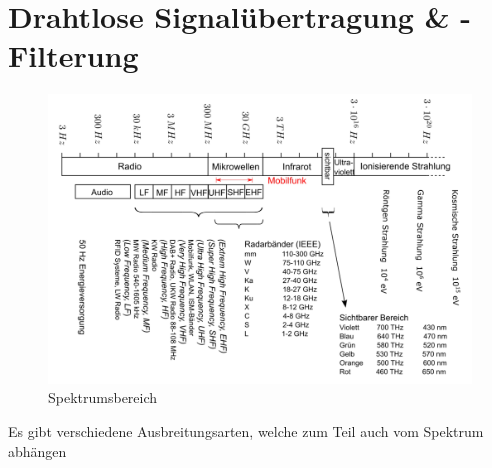 \documentclass[
  10pt,
  a4paper,
  german]{article}
\numberwithin{equation}{section}
\begin{document}
\hypertarget{drahtlose-signaluxfcbertragung--filterung}{%
\section{Drahtlose Signalübertragung \&
-Filterung}\label{drahtlose-signaluxfcbertragung--filterung}}

\begin{figure}[H]

{\centering \includegraphics{images/04_Spektrumsbereich.png}

}

\caption{Spektrumsbereich}

\end{figure}

Es gibt verschiedene Ausbreitungsarten, welche zum Teil auch vom
Spektrum abhängen
\end{document}
